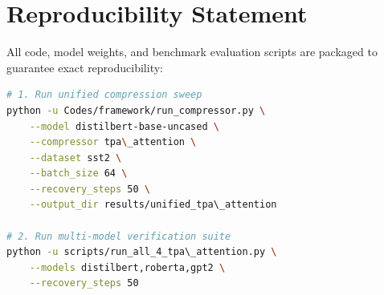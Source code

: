 \section{Reproducibility Statement}
All code, model weights, and benchmark evaluation scripts are packaged to guarantee exact reproducibility:
\begin{lstlisting}[language=bash]
# 1. Run unified compression sweep
python -u Codes/framework/run_compressor.py \
    --model distilbert-base-uncased \
    --compressor tpa\_attention \
    --dataset sst2 \
    --batch_size 64 \
    --recovery_steps 50 \
    --output_dir results/unified_tpa\_attention

# 2. Run multi-model verification suite
python -u scripts/run_all_4_tpa\_attention.py \
    --models distilbert,roberta,gpt2 \
    --recovery_steps 50
\end{lstlisting}
